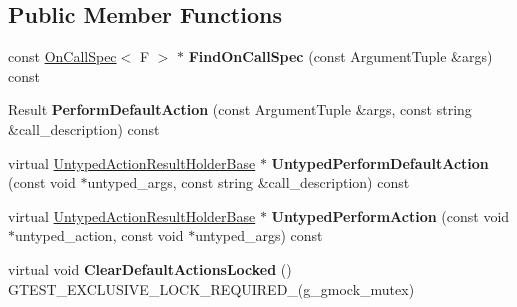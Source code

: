 \subsection*{Public Member Functions}
\begin{DoxyCompactItemize}
\item 
const \hyperlink{classtesting_1_1internal_1_1OnCallSpec}{On\+Call\+Spec}$<$ F $>$ $\ast$ {\bfseries Find\+On\+Call\+Spec} (const Argument\+Tuple \&args) const \hypertarget{classtesting_1_1internal_1_1FunctionMockerBase_ad6bb28c611196d8ee904c3534a4219b4}{}\label{classtesting_1_1internal_1_1FunctionMockerBase_ad6bb28c611196d8ee904c3534a4219b4}

\item 
Result {\bfseries Perform\+Default\+Action} (const Argument\+Tuple \&args, const string \&call\+\_\+description) const \hypertarget{classtesting_1_1internal_1_1FunctionMockerBase_a09ebd4fe971ed91af84c5e4dda89e3c0}{}\label{classtesting_1_1internal_1_1FunctionMockerBase_a09ebd4fe971ed91af84c5e4dda89e3c0}

\item 
virtual \hyperlink{classtesting_1_1internal_1_1UntypedActionResultHolderBase}{Untyped\+Action\+Result\+Holder\+Base} $\ast$ {\bfseries Untyped\+Perform\+Default\+Action} (const void $\ast$untyped\+\_\+args, const string \&call\+\_\+description) const \hypertarget{classtesting_1_1internal_1_1FunctionMockerBase_a044acb691ab73466a31a0a9d9e2f05b9}{}\label{classtesting_1_1internal_1_1FunctionMockerBase_a044acb691ab73466a31a0a9d9e2f05b9}

\item 
virtual \hyperlink{classtesting_1_1internal_1_1UntypedActionResultHolderBase}{Untyped\+Action\+Result\+Holder\+Base} $\ast$ {\bfseries Untyped\+Perform\+Action} (const void $\ast$untyped\+\_\+action, const void $\ast$untyped\+\_\+args) const \hypertarget{classtesting_1_1internal_1_1FunctionMockerBase_ab769eb5da0003b3a8a51f77829036bc0}{}\label{classtesting_1_1internal_1_1FunctionMockerBase_ab769eb5da0003b3a8a51f77829036bc0}

\item 
virtual void {\bfseries Clear\+Default\+Actions\+Locked} () G\+T\+E\+S\+T\+\_\+\+E\+X\+C\+L\+U\+S\+I\+V\+E\+\_\+\+L\+O\+C\+K\+\_\+\+R\+E\+Q\+U\+I\+R\+E\+D\+\_\+(g\+\_\+gmock\+\_\+mutex)\hypertarget{classtesting_1_1internal_1_1FunctionMockerBase_ada818fcb2b892f21bb939def386599e7}{}\label{classtesting_1_1internal_1_1FunctionMockerBase_ada818fcb2b892f21bb939def386599e7}

\end{DoxyCompactItemize}
